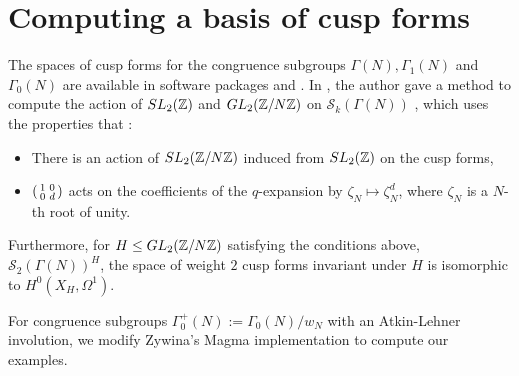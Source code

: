 \section{Computing a basis of cusp forms}

The spaces of cusp forms for the congruence subgroups $\Gamma(N), \Gamma_1(N)$ and $\Gamma_0(N)$ are available in software packages \cite{sagemath} and \cite{magma}. In \cite{Zywina2020ComputingAO}, the author gave a method to compute the action of $SL_2(\mathbb{Z})$ and $GL_2(\mathbb{Z}/N\mathbb{Z})$ on $\mathcal{S}_k(\Gamma(N))$ , which uses the properties that \cite{Brunault2020}:

\begin{itemize}
    \item There is an action of $SL_2(\mathbb{Z}/N\mathbb{Z})$ induced from $SL_2(\mathbb{Z})$ on the cusp forms,
    \item $\begin{psmallmatrix} 1 & 0 \\ 0 & d \end{psmallmatrix}$ acts on the coefficients of the $q$-expansion by $\zeta_N \mapsto \zeta_N^d$, where $\zeta_N$ is a $N$-th root of unity. 
\end{itemize}

Furthermore, for $H \leq GL_2(\mathbb{Z}/N\mathbb{Z})$ satisfying the conditions above, $\mathcal{S}_2(\Gamma(N))^H$, the space of weight $2$ cusp forms invariant under $H$ is isomorphic to $H^0(X_H,\Omega^1)$. 

For congruence subgroups $\Gamma_0^+(N) := \Gamma_0(N)/w_N$ with an Atkin-Lehner involution, we modify Zywina's Magma implementation to compute our examples.
